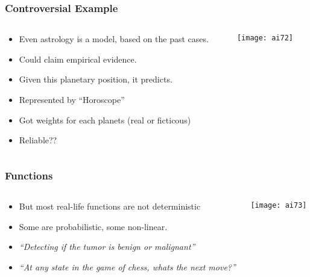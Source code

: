 \begin{frame}[fragile]\frametitle{Controversial Example}

\begin{columns}
    \begin{column}[T]{0.6\linewidth}

\begin{itemize}
\item Even astrology is a model, based on the past cases.
\item Could claim empirical evidence. 
\item Given this planetary position, it predicts.
\item Represented by ``Horoscope''
\item Got weights for each planets (real or ficticous)
\item Reliable??
\end{itemize}

    \end{column}
    \begin{column}[T]{0.4\linewidth}

			\begin{center}
			\texttt{[image: ai72]}
			\end{center}
			
    \end{column}
  \end{columns}
  
\end{frame}



\begin{frame}[fragile]\frametitle{Functions}

\begin{columns}
    \begin{column}[T]{0.6\linewidth}

\begin{itemize}
\item But most real-life functions are not deterministic
\item Some are probabilistic, some non-linear.
\item {\em ``Detecting if the tumor is benign or malignant''}
\item {\em ``At any state in the game of chess, whats the next move?''}
\end{itemize}

    \end{column}
    \begin{column}[T]{0.4\linewidth}

			\begin{center}
			\texttt{[image: ai73]}
			\end{center}
			
    \end{column}
  \end{columns}
  
  
  

\end{frame}

